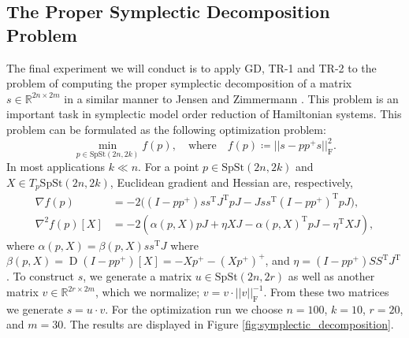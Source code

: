 \subsection{The Proper Symplectic Decomposition Problem}\label{sec:symplectic_decomposition}
The final experiment we will conduct is to apply GD, TR-1 and TR-2 to the problem of computing the proper symplectic decomposition of a matrix $s\in \mathbb{R}^{2n\times 2m}$ in a similar manner to Jensen and Zimmermann \cite[p.~18]{JensenZimmermann2024}. This problem is an important task in symplectic model order reduction of Hamiltonian systems. This problem can be formulated as the following optimization problem:
%
\begin{equation}
\min_{p \in \mathrm{SpSt}(2n, 2k)}f(p),\quad\text{where}\quad f(p)\coloneqq\lvert \lvert s-pp^{+}s \rvert  \rvert _{\mathrm{F}}^{2}.
\end{equation}
%
In most applications $k\ll n$. For a point $p\in \mathrm{SpSt}(2n, 2k)$ and $X\in T_{p}\mathrm{SpSt}(2n, 2k)$, Euclidean gradient and Hessian are, respectively,
%
\begin{align*}
\nabla f(p)&=-2\big((I-pp^{+})ss^{\mathrm{T}}J^{\mathrm{T}}pJ-Jss^{\mathrm{T}}(I-pp^{+})^{\mathrm{T}}pJ\big), \\
\nabla^{2}f(p)[X]&=-2(\alpha(p,X)pJ+\eta XJ-\alpha(p,X)^{\mathrm{T}}pJ-\eta ^{\mathrm{T}}XJ),
\end{align*}
%
where $\alpha(p,X)=\beta(p,X)ss^{\mathrm{T}}J$ where $\beta(p,X)=\operatorname{D}(I-pp^{+})[X]=-Xp^{+}-(Xp^{+})^{+}$, and $\eta=(I-pp^{+})SS^{\mathrm{T}}J^{\mathrm{T}}$. To construct $s$, we generate a matrix $u\in \mathrm{SpSt}(2n, 2r)$ as well as another matrix $v\in \mathbb{R}^{2r\times 2m}$, which we normalize; $v=v\cdot \lvert \lvert v \rvert \rvert_{\mathrm{F}}^{-1}$. From these two matrices we generate $s=u\cdot v$. For the optimization run we choose $n=100$, $k=10$, $r=20$, and $m=30$. The results are displayed in Figure \ref{fig:symplectic_decomposition}.

